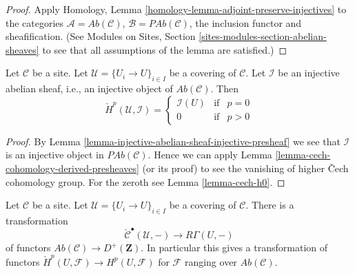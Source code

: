 \begin{proof}
Apply Homology, Lemma \ref{homology-lemma-adjoint-preserve-injectives}
to the categories $\mathcal{A} = \textit{Ab}(\mathcal{C})$,
$\mathcal{B} = \textit{PAb}(\mathcal{C})$, the inclusion functor
and sheafification. (See
Modules on Sites, Section \ref{sites-modules-section-abelian-sheaves} to see
that all assumptions of the lemma are satisfied.)
\end{proof}

\begin{lemma}
\label{lemma-injective-trivial-cech}
Let $\mathcal{C}$ be a site.
Let $\mathcal{U} = \{U_i \to U\}_{i \in I}$ be a covering of $\mathcal{C}$.
Let $\mathcal{I}$ be an injective abelian sheaf, i.e., an injective
object of $\textit{Ab}(\mathcal{C})$.
Then
$$
\check{H}^p(\mathcal{U}, \mathcal{I}) =
\left\{
\begin{matrix}
\mathcal{I}(U) & \text{if} & p = 0 \\
0 & \text{if} & p > 0
\end{matrix}
\right.
$$
\end{lemma}

\begin{proof}
By Lemma \ref{lemma-injective-abelian-sheaf-injective-presheaf}
we see that $\mathcal{I}$ is an injective object in
$\textit{PAb}(\mathcal{C})$.
Hence we can apply Lemma \ref{lemma-cech-cohomology-derived-presheaves}
(or its proof) to see the vanishing of higher {\v C}ech cohomology group.
For the zeroth see Lemma \ref{lemma-cech-h0}.
\end{proof}

\begin{lemma}
\label{lemma-cech-cohomology}
Let $\mathcal{C}$ be a site.
Let $\mathcal{U} = \{U_i \to U\}_{i \in I}$ be a covering of $\mathcal{C}$.
There is a transformation
$$
\check{\mathcal{C}}^\bullet(\mathcal{U}, -)
\longrightarrow
R\Gamma(U, -)
$$
of functors
$\textit{Ab}(\mathcal{C}) \to D^{+}(\mathbf{Z})$.
In particular this gives a transformation of functors
$\check{H}^p(U, \mathcal{F}) \to H^p(U, \mathcal{F})$ for
$\mathcal{F}$ ranging over $\textit{Ab}(\mathcal{C})$.
\end{lemma}

